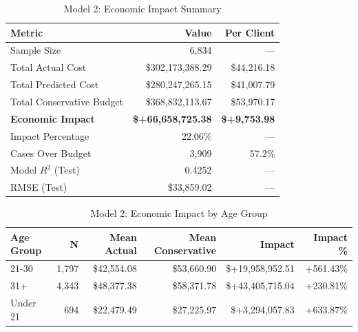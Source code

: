 \begin{table}[htbp]
\centering
\small
\caption{Model 2: Economic Impact Summary}
\label{tab:model2_impact_summary}
\begin{tabular}{lrr}
\toprule
\textbf{Metric} & \textbf{Value} & \textbf{Per Client} \\
\midrule
Sample Size & 6,834 & --- \\
\midrule
Total Actual Cost & \$302,173,388.29 & \$44,216.18 \\
Total Predicted Cost & \$280,247,265.15 & \$41,007.79 \\
Total Conservative Budget & \$368,832,113.67 & \$53,970.17 \\
\midrule
\textbf{Economic Impact} & \textbf{\$+66,658,725.38} & \textbf{\$+9,753.98} \\
Impact Percentage & 22.06\% & --- \\
\midrule
Cases Over Budget & 3,909 & 57.2\% \\
\midrule
Model $R^2$ (Test) & 0.4252 & --- \\
RMSE (Test) & \$33,859.02 & --- \\
\bottomrule
\end{tabular}
\end{table}

\begin{table}[htbp]
\centering
\small
\caption{Model 2: Economic Impact by Age Group}
\label{tab:model2_impact_age}
\begin{tabular}{lrrrrr}
\toprule
\textbf{Age Group} & \textbf{N} & \textbf{Mean Actual} & \textbf{Mean Conservative} & \textbf{Impact} & \textbf{Impact \%} \\
\midrule
21-30 & 1,797 & \$42,554.08 & \$53,660.90 & \$+19,958,952.51 & +561.43\% \\
31+ & 4,343 & \$48,377.38 & \$58,371.78 & \$+43,405,715.04 & +230.81\% \\
Under 21 & 694 & \$22,479.49 & \$27,225.97 & \$+3,294,057.83 & +633.87\% \\
\bottomrule
\end{tabular}
\end{table}


